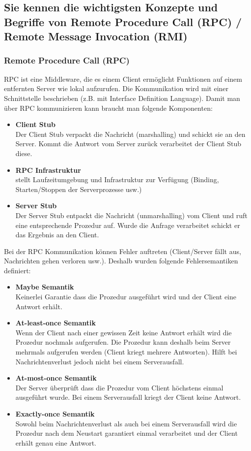 \subsection{Sie kennen die wichtigsten Konzepte und Begriffe von Remote Procedure Call (RPC) / Remote Message Invocation (RMI)}

\subsubsection{Remote Procedure Call (RPC)}

RPC ist eine Middleware, die es einem Client ermöglicht Funktionen auf einem entfernten Server wie lokal aufzurufen. Die Kommunikation wird mit einer Schnittstelle beschrieben (z.B. mit Interface Definition Language). Damit man über RPC kommunizieren kann braucht man folgende Komponenten:
\begin{itemize}
	\item \textbf{Client Stub} \\
	Der Client Stub verpackt die Nachricht (marshalling) und schickt sie an den Server. Kommt die Antwort vom Server zurück verarbeitet der Client Stub diese.
	\item \textbf{RPC Infrastruktur} \\
	stellt Laufzeitumgebung und Infrastruktur zur Verfügung (Binding, Starten/Stoppen der Serverprozesse usw.)
	\item \textbf{Server Stub} \\
	Der Server Stub entpackt die Nachricht (unmarshalling) vom Client und ruft eine entsprechende Prozedur auf. Wurde die Anfrage verarbeitet schickt er das Ergebnis an den Client.
\end{itemize}
Bei der RPC Kommunikation können Fehler auftreten (Client/Server fällt aus, Nachrichten gehen verloren usw.). Deshalb wurden folgende Fehlersemantiken definiert:

\begin{itemize}
	\item \textbf{Maybe Semantik} \\
	Keinerlei Garantie dass die Prozedur ausgeführt wird und der Client eine Antwort erhält.
	\item \textbf{At-least-once Semantik} \\
	Wenn der Client nach einer gewissen Zeit keine Antwort erhält wird die Prozedur nochmals aufgerufen. Die Prozedur kann deshalb beim Server mehrmals aufgerufen werden (Client kriegt mehrere Antworten). Hilft bei Nachrichtenverlust jedoch nicht bei einem Serverausfall.
	\item \textbf{At-most-once Semantik} \\
	Der Server überprüft dass die Prozedur vom Client höchstens einmal ausgeführt wurde. Bei einem Serverausfall kriegt der Client keine Antwort.
	\item \textbf{Exactly-once Semantik} \\
	Sowohl beim Nachrichtenverlust als auch bei einem Serverausfall wird die Prozedur nach dem Neustart garantiert einmal verarbeitet und der Client erhält genau eine Antwort.
\end{itemize}

